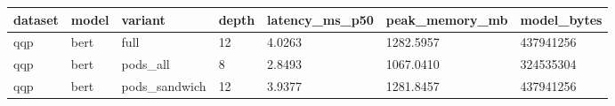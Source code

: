 \begin{tabular}{lllllll}
\hline
dataset & model & variant & depth & latency\_ms\_p50 & peak\_memory\_mb & model\_bytes \\
\hline
qqp & bert & full & 12 & 4.0263 & 1282.5957 & 437941256 \\
qqp & bert & pods\_all & 8 & 2.8493 & 1067.0410 & 324535304 \\
qqp & bert & pods\_sandwich & 12 & 3.9377 & 1281.8457 & 437941256 \\
\hline
\end{tabular}
